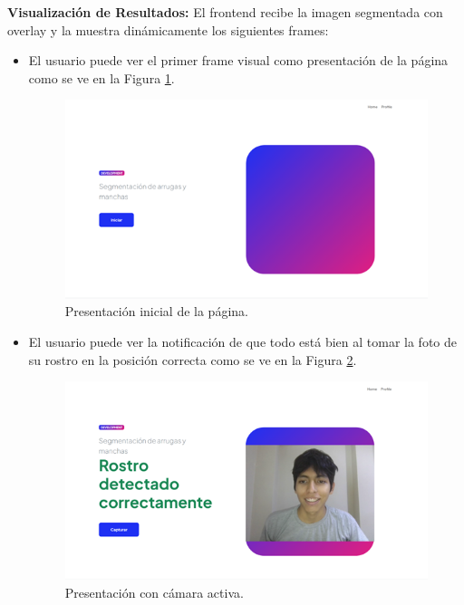 \textbf{Visualización de Resultados:}
El frontend recibe la imagen segmentada con overlay y la muestra dinámicamente los siguientes frames: 
\begin{itemize}
  \item El usuario puede ver el primer frame visual como presentación de la página como se ve en la Figura \ref{fig:presinicial}.

\begin{figure}[H]
      \centering
      \includegraphics[width=1\textwidth]{4/figures/PresentacionInicialPage.png}
      \caption{Presentación inicial de la página.}
      \label{fig:presinicial}
    \end{figure}

\item El usuario puede ver la notificación de que todo está bien al tomar la foto de su rostro en la posición correcta como se ve en la Figura \ref{fig:prescamact}.
\begin{figure}[H]
      \centering
      \includegraphics[width=1\textwidth]{4/figures/PresCamActive.png}
      \caption{Presentación con cámara activa.}
      \label{fig:prescamact}
    \end{figure}


\end{itemize}
